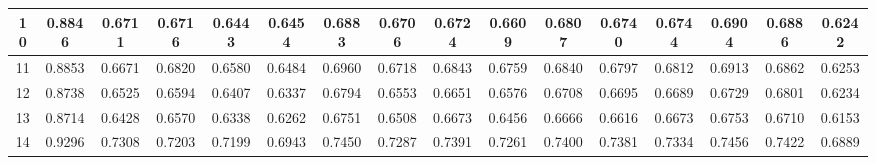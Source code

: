 \documentclass{jarticle}     %
\begin{document}
\begin{table}[ht]
{\begin{tabular}{|c|c|c|c|c|c|c|c|c|c|c|c|c|c|c|c|}
      \multicolumn{1}{|c|}{10} & 0.8846 & 0.6711 & 0.6716 & 0.6443 & 0.6454 & 0.6883 & 0.6706 & 0.6724 & 0.6609 & 0.6807 & 0.6740 & 0.6744 & 0.6904 & 0.6886 & 0.6242 \\ \hline
      \multicolumn{1}{|c|}{11} & 0.8853 & 0.6671 & 0.6820 & 0.6580 & 0.6484 & 0.6960 & 0.6718 & 0.6843 & 0.6759 & 0.6840 & 0.6797 & 0.6812 & 0.6913 & 0.6862 & 0.6253 \\ \hline
      \multicolumn{1}{|c|}{12} & 0.8738 & 0.6525 & 0.6594 & 0.6407 & 0.6337 & 0.6794 & 0.6553 & 0.6651 & 0.6576 & 0.6708 & 0.6695 & 0.6689 & 0.6729 & 0.6801 & 0.6234 \\ \hline
      \multicolumn{1}{|c|}{13} & 0.8714 & 0.6428 & 0.6570 & 0.6338 & 0.6262 & 0.6751 & 0.6508 & 0.6673 & 0.6456 & 0.6666 & 0.6616 & 0.6673 & 0.6753 & 0.6710 & 0.6153 \\ \hline
      \multicolumn{1}{|c|}{14} & 0.9296 & 0.7308 & 0.7203 & 0.7199 & 0.6943 & 0.7450 & 0.7287 & 0.7391 & 0.7261 & 0.7400 & 0.7381 & 0.7334 & 0.7456 & 0.7422 & 0.6889 \\ \hline
      \end{tabular}
  }
  
  \end{table}





\end{document}
